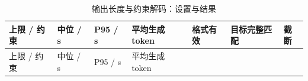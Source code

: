 \FloatBarrier\begingroup\small\setlength{\tabcolsep}{2.5pt}
\begin{longtable}[]{@{}
  >{\raggedright\arraybackslash}p{}
  >{\raggedright\arraybackslash}p{}
  >{\raggedright\arraybackslash}p{}
  >{\raggedright\arraybackslash}p{}
  >{\raggedright\arraybackslash}p{}
  >{\raggedright\arraybackslash}p{}
  >{\raggedright\arraybackslash}p{}@{}}
\caption{输出长度与约束解码：设置与结果}\label{tab:s18-4}\tabularnewline
\toprule\noalign{}
\begin{minipage}[b]{\linewidth}\raggedright
上限 / 约束
\end{minipage} & \begin{minipage}[b]{\linewidth}\raggedright
中位 / s
\end{minipage} & \begin{minipage}[b]{\linewidth}\raggedright
P95 / s
\end{minipage} & \begin{minipage}[b]{\linewidth}\raggedright
平均生成token
\end{minipage} & \begin{minipage}[b]{\linewidth}\raggedright
格式有效
\end{minipage} & \begin{minipage}[b]{\linewidth}\raggedright
目标完整匹配
\end{minipage} & \begin{minipage}[b]{\linewidth}\raggedright
截断
\end{minipage} \\
\midrule\noalign{}
\endfirsthead
\toprule\noalign{}
\begin{minipage}[b]{\linewidth}\raggedright
上限 / 约束
\end{minipage} & \begin{minipage}[b]{\linewidth}\raggedright
中位 / s
\end{minipage} & \begin{minipage}[b]{\linewidth}\raggedright
P95 / s
\end{minipage} & \begin{minipage}[b]{\linewidth}\raggedright
平均生成token
\end{minipage} & \begin{minipage}[b]{\linewidth}\raggedright

\end{minipage}
\end{longtable}
